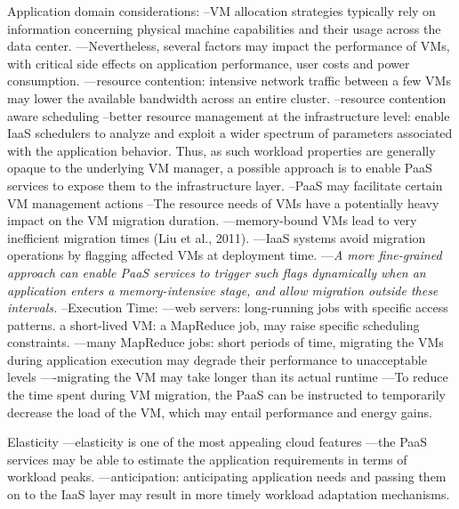 Application domain considerations:
--VM allocation strategies typically rely on information concerning physical machine capabilities and their usage across the data center. 
---Nevertheless, several factors may impact the performance of VMs, with critical side effects on application performance, user costs and power consumption.
---resource contention: intensive network traffic between a few VMs may lower the available bandwidth across an entire cluster. 
--resource contention aware scheduling
--better resource management at the infrastructure level: enable IaaS schedulers to analyze and exploit a wider spectrum of parameters associated with the application behavior. Thus, as such workload properties are generally opaque to the underlying VM manager, a possible approach is to enable PaaS services to expose them to the infrastructure layer.
--PaaS may facilitate certain VM management actions
--The resource needs of VMs have a potentially heavy impact on the VM migration duration.
---memory-bound VMs lead to very inefficient migration times (Liu et al., 2011).
---IaaS systems avoid migration operations by flagging affected VMs at deployment time.
---\textit{A more fine-grained approach can enable PaaS services to trigger such flags dynamically when an application enters a memory-intensive stage, and allow migration outside these intervals.}
--Execution Time:
---web servers: long-running jobs with specific access patterns. a short-lived VM: a MapReduce job, may raise specific scheduling constraints. 
---many MapReduce jobs: short periods of time, migrating the VMs during application execution may degrade their performance to unacceptable levels
----migrating the VM may take longer than its actual runtime
---To reduce the time spent during VM migration, the PaaS can be instructed to temporarily decrease the load of the VM, which may entail performance and energy gains.

Elasticity
---elasticity is one of the most appealing cloud features
---the PaaS services may be able to estimate the application requirements in terms of workload peaks.
---anticipation: anticipating application needs and passing them on to the IaaS layer may result in more timely workload adaptation mechanisms.

